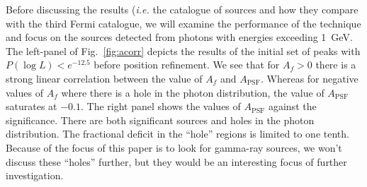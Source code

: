 \documentclass[useAMS,usenatbib]{mn2e}
\begin{document}
Before discussing the results ({\em i.e.} the catalogue of sources and
how they compare with the third Fermi catalogue, we will examine the
performance of the technique and focus on the sources detected from
photons with energies exceeding 1~GeV.  The left-panel of
Fig.~\ref{fig:acorr} depicts the results of the initial set of peaks
with $P(\log L)<e^{-12.5}$ before position refinement.  We see that
for $A_f>0$ there is a strong linear correlation between the value of
$A_f$ and $A_\mathrm{PSF}$.  Whereas for negative values of $A_f$
where there is a hole in the photon distribution, the value of
$A_\mathrm{PSF}$ saturates at $-0.1$. The right panel shows the values
of $A_\mathrm{PSF}$ against the significance.  There are both
significant sources and holes in the photon distribution.  The
fractional deficit in the ``hole'' regions is limited to one tenth.
Because of the focus of this paper is to look for gamma-ray sources,
we won't discuss these ``holes'' further, but they would be an
interesting focus of further investigation. 
\end{document}
